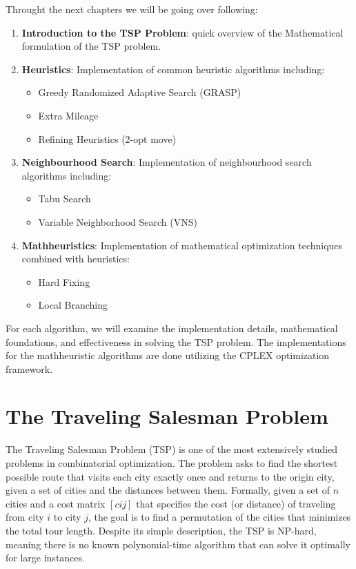 \documentclass{article}
\begin{document}
Throught the next chapters we will be going over following:
\begin{enumerate}
	\item \textbf{Introduction to the TSP Problem}: quick overview of the Mathematical formulation of the TSP problem.
	\item \textbf{Heuristics}: Implementation of common heuristic algorithms including:
		\begin{itemize}
			\item Greedy Randomized Adaptive Search (GRASP)
			\item Extra Mileage
			\item Refining Heuristics (2-opt move)
		\end{itemize}
	\item \textbf{Neighbourhood Search}: Implementation of neighbourhood search algorithms including:
		\begin{itemize}
			\item Tabu Search
			\item Variable Neighborhood Search (VNS)
		\end{itemize}
	\item \textbf{Mathheuristics}: Implementation of mathematical optimization techniques combined with heuristics:
		\begin{itemize}
			\item Hard Fixing
			\item Local Branching
		\end{itemize}
\end{enumerate}

For each algorithm, we will examine the implementation details, mathematical foundations, and effectiveness in solving the TSP problem. 
The implementations for the mathheuristic algorithms are done utilizing the CPLEX optimization framework. 

\newpage

\section{The Traveling Salesman Problem}
The Traveling Salesman Problem (TSP) is one of the most extensively studied problems in combinatorial optimization. The problem asks to find the shortest possible route that visits each city exactly once and returns to the origin city, 
given a set of cities and the distances between them.
Formally, given a set of $n$ cities and a cost matrix $[cij]$ that specifies the cost (or distance) of traveling from city $i$ to city $j$, the goal is to find a permutation of the cities that minimizes the total tour length. 
Despite its simple description, the TSP is NP-hard, meaning there is no known polynomial-time algorithm that can solve it optimally for large instances.
\end{document}
